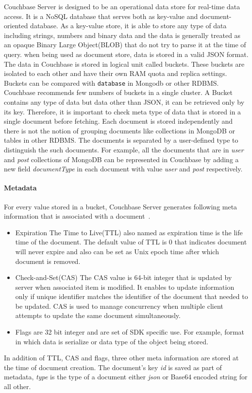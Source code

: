  Couchbase Server is designed to be an operational data store for real-time data access. It is a NoSQL database that serves both as key-value and  document-oriented database. As a key-value store, it is able to store any type of data including  strings, numbers and binary data and the data is generally treated as an opaque Binary Large Object(BLOB) that do not try to parse it at the time of query. when being used as document store, data is stored in a valid JSON format. The data in Couchbase is stored in logical unit called buckets. These buckets  are isolated to each other and have their own RAM quota and replica settings. Buckets can be compared with \texttt{database} in Mongodb or other RDBMS. Couchbase recommends few numbers of buckets in a single cluster. A Bucket contains any type of data but data other than JSON, it can be retrieved only by its key. Therefore, it is important to check meta type of data that is stored in a single document before fetching. Each document is stored independently and there is not the notion of grouping documents like collections in MongoDB or tables in other RDBMS. The documents is separated by a user-defined type to distinguish the such documents.  For example, all the documents that are in \textit{user} and \textit{post} collections of MongoDB can be represented in Couchbase by adding a new field \textit{documentType}  in each document  with value \textit{user} and \textit{post} respectively.  
\label{cb-metadata}
\paragraph{Metadata}
For every value stored in a bucket, Couchbase Server generates following meta information that is associated with a document~\cite[p. 26]{cb/ostrovsky2014pro}. 
\begin{itemize}
	\item{Expiration}
		The Time to Live(TTL) also named as expiration time is the life time of the document. The default value of TTL is 0 that indicates document will never expire and also can be set as Unix epoch time after which document is removed.
	
	\item{Check-and-Set(CAS)}
		The CAS value is 64-bit integer that is updated by server when associated item is modified. It enables to update information only if unique identifier matches the identifier of the document that needed to be updated. CAS is used to manage concurrency when multiple client attempts to update the same document simultaneously. 
	\item{Flags} are 32 bit integer and are set of SDK specific use. For example, format in which data is serialize or data type of the object being stored.
\end{itemize}	
In addition of TTL, CAS and flags, three other meta information are stored at the time of document creation. The document's key \textit{id} is saved as part of metadata, \textit{type} is the type of a document either \textit{json} or Base64 encoded string for all other.
